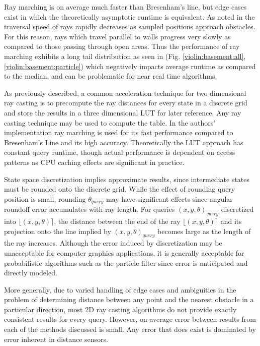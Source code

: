 \documentclass[letterpaper, 10 pt, conference]{ieeeconf}  %
\begin{document}
Ray marching is on average much faster than Bresenham’s line, but edge cases exist in which the theoretically asymptotic runtime is equivalent. As noted in \cite{acceleratedraymarching} the traversal speed of rays rapidly decreases as sampled positions approach obstacles. For this reason, rays which travel parallel to walls progress very slowly as compared to those passing through open areas. Thus the performance of ray marching exhibits a long tail distribution as seen in (Fig. \ref{violin:basement:all}, \ref{violin:basement:particle}) which negatively impacts average runtime as compared to the median, and can be problematic for near real time algorithms.

As previously described, a common acceleration technique for two dimensional ray casting is to precompute the ray distances for every state in a discrete grid and store the results in a three dimensional LUT for later reference. Any ray casting technique may be used to compute the table. In the authors’ implementation ray marching is used for its fast performance compared to Bresenham's Line and its high accuracy. Theoretically the LUT approach has constant query runtime, though actual performance is dependent on access patterns as CPU caching effects are significant in practice.

State space discretization implies approximate results, since intermediate states must be rounded onto the discrete grid. While the effect of rounding query position is small, rounding $\theta_{query}$ may have significant effects since angular roundoff error accumulates with ray length. For queries $(x,y,\theta)_{query}$ discretized into $\lfloor(x,y,\theta)\rceil$, the distance between the end of the ray $\lfloor(x,y,\theta)\rceil$ and its projection onto the line implied by $(x,y,\theta)_{query}$ becomes large as the length of the ray increases. Although the error induced by discretization may be unacceptable for computer graphics applications, it is generally acceptable for probabilistic algorithms such as the particle filter since error is anticipated and directly modeled. 

More generally, due to varied handling of edge cases and ambiguities in the problem of determining distance between any point and the nearest obstacle in a particular direction, most 2D ray casting algorithms do not provide exactly consistent results for every query. However, on average error between results from each of the methods discussed is small. Any error that does exist is dominated by error inherent in distance sensors.
\end{document}
